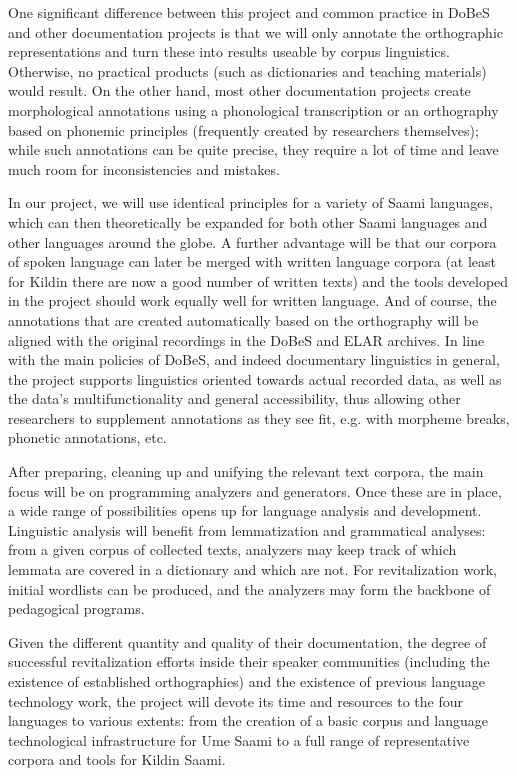 \documentclass[a4paper,12pt]{article}
\begin{document}
One significant difference between this project and common practice in DoBeS and other documentation projects is that we will only annotate the orthographic representations and turn these into results useable by corpus linguistics. Otherwise, no practical products (such as dictionaries and teaching materials) would result. On the other hand, most other documentation projects create morphological annotations using a phonological transcription or an orthography based on phonemic principles (frequently created by researchers themselves); while such annotations can be quite precise, they require a lot of time and leave much room for inconsistencies and mistakes.

In our project, we will use identical principles for a variety of Saami languages, which can then theoretically be expanded for both other Saami languages and other languages around the globe. A further advantage will be that our corpora of spoken language can later be merged with written language corpora (at least for Kildin there are now a good number of written texts) and the tools developed in the project should work equally well for written language. And of course, the annotations that are created automatically based on the orthography will be aligned with the original recordings in the DoBeS and ELAR archives. In line with the main policies of DoBeS, and indeed documentary linguistics in general, the project supports linguistics oriented towards actual recorded data, as well as the data's multifunctionality and general accessibility, thus allowing other researchers to supplement annotations as they see fit, e.g. with morpheme breaks, phonetic annotations, etc.

After preparing, cleaning up and unifying the relevant text corpora, the main focus will be on programming analyzers and generators. Once these are in place, a wide range of possibilities opens up for language analysis and development. Linguistic analysis will benefit from lemmatization and grammatical analyses: from a given corpus of collected texts, analyzers may keep track of which lemmata are covered in a dictionary and which are not. For revitalization work, initial wordlists can be produced, and the analyzers may form the backbone of pedagogical programs.

Given the different quantity and quality of their documentation, the degree of successful revitalization efforts inside their speaker communities (including the existence of established orthographies) and the existence of previous language technology work, the project will devote its time and resources to the four languages to various extents: from the creation of a basic corpus and language technological infrastructure for Ume Saami to a full range of representative corpora and tools for Kildin Saami.
\end{document}
